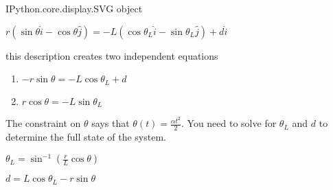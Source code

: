 \documentclass[letterpaper,10pt,english]{sphinxmanual}
\begin{document}
\begin{sphinxVerbatim}[commandchars=\\\{\}]
\PYGZlt{}IPython.core.display.SVG object\PYGZgt{}
\end{sphinxVerbatim}

\(r(\sin\theta\hat{i} - \cos\theta \hat{j}) =
-L(\cos\theta_{L}\hat{i}-\sin\theta_L\hat{j}) + d\hat{i}\)

this description creates two independent equations
\begin{enumerate}
%
\item {} 
\(-r\sin\theta = -L\cos\theta_{L}+ d\)

\item {} 
\(r\cos\theta = -L\sin\theta_L\)

\end{enumerate}

The constraint on \(\theta\) says that \(\theta(t)=\frac{\alpha t^2}{2}\).
You need to solve for \(\theta_L\) and \(d\) to determine the full
state of the system.

\(\theta_L = \sin^{-1}\left(\frac{r}{L}\cos\theta\right)\)

\(d = L\cos\theta_{L}-r\sin\theta\)
\end{document}

